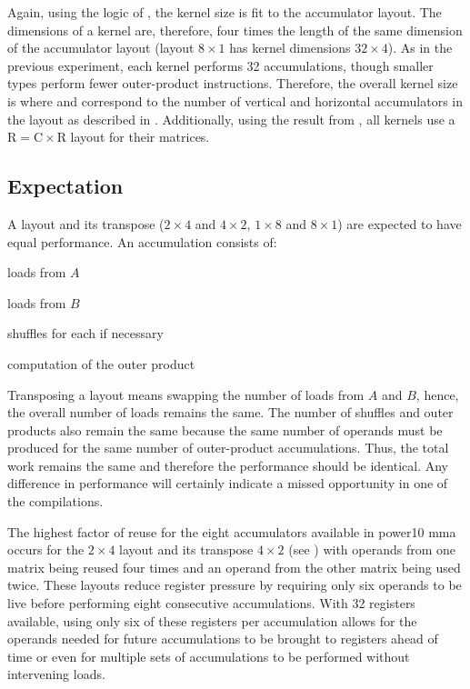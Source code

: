\documentclass[\main/thesis.tex]{subfiles}
\begin{document}
Again, using the logic of , the kernel size is fit to the accumulator layout.
The dimensions of a kernel are, therefore, four times the length of the same dimension of the accumulator layout (\eg layout $8 \times 1$ has kernel dimensions $32 \times 4$).
As in the previous experiment, each kernel performs 32 accumulations, though smaller types perform fewer outer-product instructions.
Therefore, the overall kernel size is  where  and  correspond to the number of vertical and horizontal accumulators in the layout as described in .
Additionally, using the result from , all kernels use a $\textrm{R} = \textrm{C} \times \textrm{R}$ layout for their matrices.

\subsection{Expectation}
\label{sec:layoutExpectation}
A layout and its transpose ($2 \times 4$ and $4 \times 2$, $1 \times 8$ and $8 \times 1$) are expected to have equal performance.
An accumulation consists of:
\begin{enumerate*}[itemjoin={{; }}, itemjoin*={{; and finally }}, label={}, afterlabel={}, after={.}]
  \item loads from $A$
  \item loads from $B$
  \item shuffles for each if necessary
  \item computation of the outer product
\end{enumerate*}
Transposing a layout means swapping the number of loads from $A$ and $B$, hence, the overall number of loads remains the same.
The number of shuffles and outer products also remain the same because the same number of operands must be produced for the same number of outer-product accumulations.
Thus, the total work remains the same and therefore the performance should be identical.
Any difference in performance will certainly indicate a missed opportunity in one of the compilations.

The highest factor of reuse for the eight accumulators available in \gls{power10} \gls{mma} occurs for the $2 \times 4$ layout and its transpose $4 \times 2$ (see ) with operands from one matrix being reused four times and an operand from the other matrix being used twice.
These layouts reduce register pressure by requiring only six operands to be \gls{live} before performing eight consecutive accumulations.
With 32 registers available, using only six of these registers per accumulation allows for the operands needed for future accumulations to be brought to registers ahead of time or even for multiple sets of accumulations to be performed without intervening loads.
\end{document}
